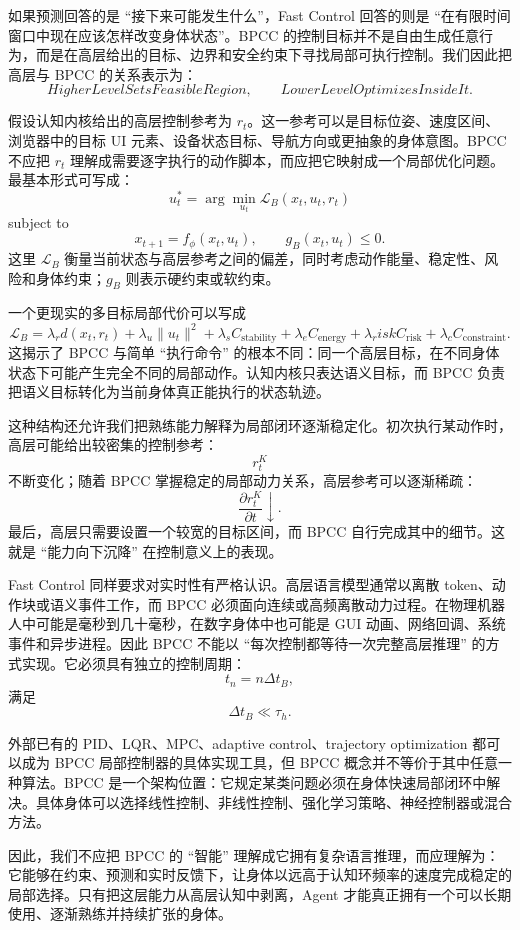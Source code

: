 如果预测回答的是 ``接下来可能发生什么''，Fast Control 回答的则是 ``在有限时间窗口中现在应该怎样改变身体状态''。BPCC 的控制目标并不是自由生成任意行为，而是在高层给出的目标、边界和安全约束下寻找局部可执行控制。我们因此把高层与 BPCC 的关系表示为：
\[
\boxed{
HigherLevelSetsFeasibleRegion,
\qquad
LowerLevelOptimizesInsideIt.
}
\]

假设认知内核给出的高层控制参考为 $r_t$。这一参考可以是目标位姿、速度区间、浏览器中的目标 UI 元素、设备状态目标、导航方向或更抽象的身体意图。BPCC 不应把 $r_t$ 理解成需要逐字执行的动作脚本，而应把它映射成一个局部优化问题。最基本形式可写成：
\[
u_t^\ast
=
\arg\min_{u_t}
\mathcal L_B
(x_t,u_t,r_t)
\]
subject to
\[
x_{t+1}=f_\phi(x_t,u_t),
\qquad
g_B(x_t,u_t)\leq0.
\]
这里 $\mathcal L_B$ 衡量当前状态与高层参考之间的偏差，同时考虑动作能量、稳定性、风险和身体约束；$g_B$ 则表示硬约束或软约束。

一个更现实的多目标局部代价可以写成
\[
\mathcal L_B
=
\lambda_r d(x_t,r_t)
+
\lambda_u\|u_t\|^2
+
\lambda_s C_{\mathrm{stability}}
+
\lambda_e C_{\mathrm{energy}}
+
\lambda_risk C_{\mathrm{risk}}
+
\lambda_c C_{\mathrm{constraint}}.
\]
这揭示了 BPCC 与简单 ``执行命令'' 的根本不同：同一个高层目标，在不同身体状态下可能产生完全不同的局部动作。认知内核只表达语义目标，而 BPCC 负责把语义目标转化为当前身体真正能执行的状态轨迹。

这种结构还允许我们把熟练能力解释为局部闭环逐渐稳定化。初次执行某动作时，高层可能给出较密集的控制参考：
\[
r_t^{K}
\]
不断变化；随着 BPCC 掌握稳定的局部动力关系，高层参考可以逐渐稀疏：
\[
\frac{\partial r_t^{K}}{\partial t}
\downarrow.
\]
最后，高层只需要设置一个较宽的目标区间，而 BPCC 自行完成其中的细节。这就是 ``能力向下沉降'' 在控制意义上的表现。

Fast Control 同样要求对实时性有严格认识。高层语言模型通常以离散 token、动作块或语义事件工作，而 BPCC 必须面向连续或高频离散动力过程。在物理机器人中可能是毫秒到几十毫秒，在数字身体中也可能是 GUI 动画、网络回调、系统事件和异步进程。因此 BPCC 不能以 ``每次控制都等待一次完整高层推理'' 的方式实现。它必须具有独立的控制周期：
\[
t_n=n\Delta t_B,
\]
满足
\[
\Delta t_B\ll\tau_h.
\]

外部已有的 PID、LQR、MPC、adaptive control、trajectory optimization 都可以成为 BPCC 局部控制器的具体实现工具，但 BPCC 概念并不等价于其中任意一种算法。BPCC 是一个架构位置：它规定某类问题必须在身体快速局部闭环中解决。具体身体可以选择线性控制、非线性控制、强化学习策略、神经控制器或混合方法。

因此，我们不应把 BPCC 的 ``智能'' 理解成它拥有复杂语言推理，而应理解为：它能够在约束、预测和实时反馈下，让身体以远高于认知环频率的速度完成稳定的局部选择。只有把这层能力从高层认知中剥离，Agent 才能真正拥有一个可以长期使用、逐渐熟练并持续扩张的身体。

